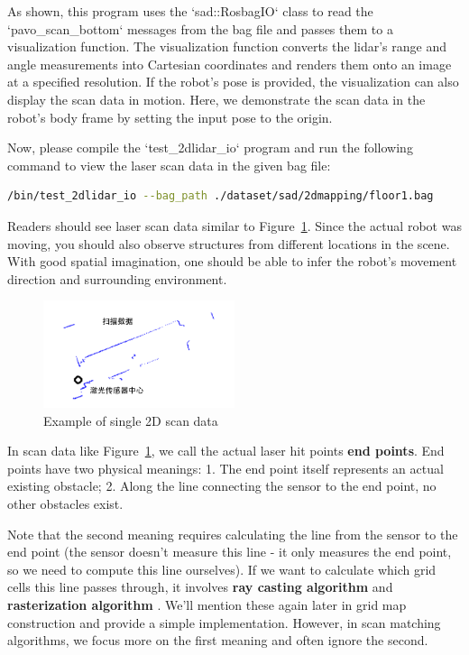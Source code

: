 As shown, this program uses the `sad::RosbagIO` class to read the `pavo_scan_bottom` messages from the bag file and passes them to a visualization function. The visualization function converts the lidar's range and angle measurements into Cartesian coordinates and renders them onto an image at a specified resolution. If the robot's pose is provided, the visualization can also display the scan data in motion. Here, we demonstrate the scan data in the robot's body frame by setting the input pose to the origin.

Now, please compile the `test_2dlidar_io` program and run the following command to view the laser scan data in the given bag file:

\begin{lstlisting}[language=sh, caption=Terminal command]
	/bin/test_2dlidar_io --bag_path ./dataset/sad/2dmapping/floor1.bag
\end{lstlisting}

Readers should see laser scan data similar to Figure~\ref{fig:2dscan}. Since the actual robot was moving, you should also observe structures from different locations in the scene. With good spatial imagination, one should be able to infer the robot's movement direction and surrounding environment.

\begin{figure}[!htp]
	\centering
	\includegraphics[width=0.5\textwidth]{resources/2d-lidar-mapping/2dscan}
	\caption{Example of single 2D scan data}
	\label{fig:2dscan}
\end{figure}

In scan data like Figure~\ref{fig:2dscan}, we call the actual laser hit points \textbf{end points}. End points have two physical meanings:
1. The end point itself represents an actual existing obstacle;
2. Along the line connecting the sensor to the end point, no other obstacles exist.

Note that the second meaning requires calculating the line from the sensor to the end point (the sensor doesn't measure this line - it only measures the end point, so we need to compute this line ourselves). If we want to calculate which grid cells this line passes through, it involves \textbf{ray casting algorithm} \cite{Ray1999} and \textbf{rasterization algorithm} \cite{Pineda1988}. We'll mention these again later in grid map construction and provide a simple implementation. However, in scan matching algorithms, we focus more on the first meaning and often ignore the second.

